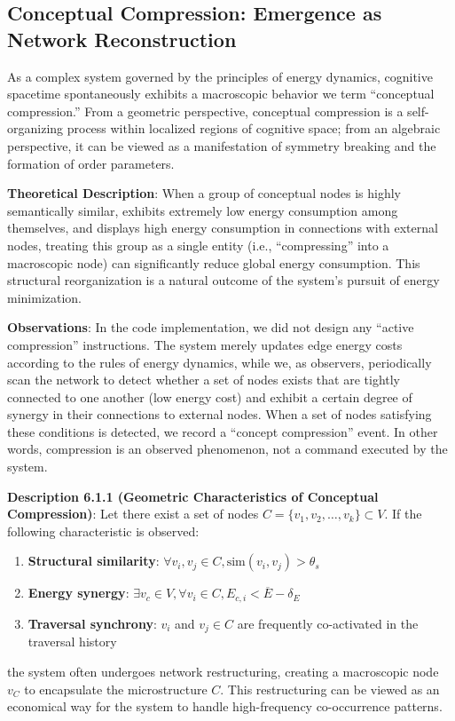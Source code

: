 \documentclass[10pt,onecolumn]{article}
\begin{document}
\subsection{Conceptual Compression: Emergence as Network Reconstruction}

As a complex system governed by the principles of energy dynamics, cognitive spacetime spontaneously exhibits a macroscopic behavior we term “conceptual compression.” From a geometric perspective, conceptual compression is a self-organizing process within localized regions of cognitive space; from an algebraic perspective, it can be viewed as a manifestation of symmetry breaking and the formation of order parameters.

\textbf{Theoretical Description}: When a group of conceptual nodes is highly semantically similar, exhibits extremely low energy consumption among themselves, and displays high energy consumption in connections with external nodes, treating this group as a single entity (i.e., “compressing” into a macroscopic node) can significantly reduce global energy consumption. This structural reorganization is a natural outcome of the system’s pursuit of energy minimization.

\textbf{Observations}: In the code implementation, we did not design any “active compression” instructions. The system merely updates edge energy costs according to the rules of energy dynamics, while we, as observers, periodically scan the network to detect whether a set of nodes exists that are tightly connected to one another (low energy cost) and exhibit a certain degree of synergy in their connections to external nodes. When a set of nodes satisfying these conditions is detected, we record a “concept compression” event. In other words, compression is an observed phenomenon, not a command executed by the system.

\textbf{Description 6.1.1 (Geometric Characteristics of Conceptual Compression)}: Let there exist a set of nodes $C = \{v_1, v_2, \ldots, v_k\} \subset V$. If the following characteristic is observed:
\begin{enumerate}
    \item \textbf{Structural similarity}: $\forall v_i, v_j \in C, \text{sim}(v_i, v_j) > \theta_s$
    \item \textbf{Energy synergy}: $\exists v_c \in V, \forall v_i \in C, E_{c,i} < \overline{E} - \delta_E$
    \item \textbf{Traversal synchrony}: $v_i$ and $v_j \in C$ are frequently co-activated in the traversal history
\end{enumerate}
the system often undergoes network restructuring, creating a macroscopic node $v_C$ to encapsulate the microstructure $C$. This restructuring can be viewed as an economical way for the system to handle high-frequency co-occurrence patterns.
\end{document}
